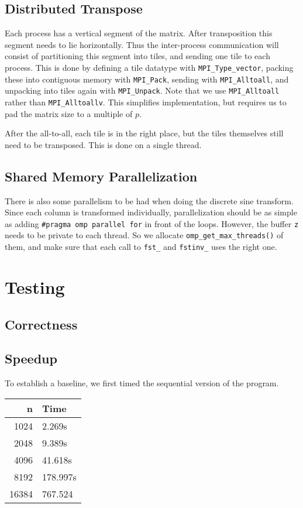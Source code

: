 \documentclass[a4paper, 12pt]{article}
\begin{document}
    \subsection{Distributed Transpose}
    Each process has a vertical segment of the matrix. After transposition this segment needs to lie horizontally. Thus the inter-process communication will consist of partitioning this segment into tiles, and sending one tile to each process. This is done by defining a tile datatype with \texttt{MPI\_Type\_vector}, packing these into contiguous memory with \texttt{MPI\_Pack}, sending with \texttt{MPI\_Alltoall}, and unpacking into tiles again with \texttt{MPI\_Unpack}. Note that we use \texttt{MPI\_Alltoall} rather than \texttt{MPI\_Alltoallv}. This simplifies implementation, but requires us to pad the matrix size to a multiple of $p$.
    
    After the all-to-all, each tile is in the right place, but the tiles themselves still need to be transposed. This is done on a single thread.
    
    \subsection{Shared Memory Parallelization}
    There is also some parallelism to be had when doing the discrete sine transform. Since each column is transformed individually, parallelization should be as simple as adding \texttt{\#pragma omp parallel for} in front of the loops. However, the buffer \texttt{z} needs to be private to each thread. So we allocate \texttt{omp\_get\_max\_threads()} of them, and make sure that each call to \texttt{fst\_} and \texttt{fstinv\_} uses the right one.
    
\section{Testing}
    \subsection{Correctness}
    
    \subsection{Speedup}
    To establish a baseline, we first timed the sequential version of the program.
    
    \begin{tabular}{|r|l|}
    \hline
    n & Time \\
    \hline
    1024 & 2.269s \\
    \hline
    2048 & 9.389s \\
    \hline
    4096 & 41.618s \\
    \hline
    8192 & 178.997s \\
    \hline
    16384 & 767.524\\
    \hline
    \end{tabular}
\end{document}
